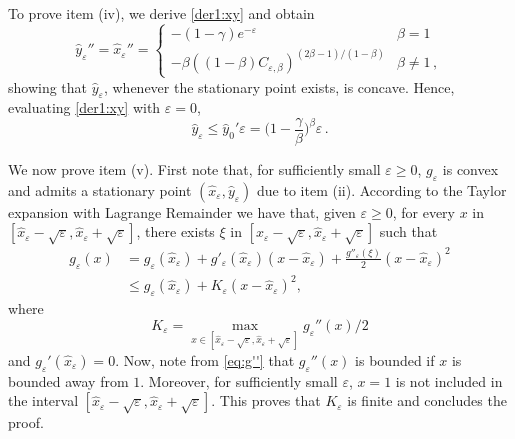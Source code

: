 \documentclass{article}
\begin{document}
        To prove item (iv), we derive \eqref{der1:xy} and obtain 
        $$\hat y_\varepsilon'' = \hat x_\varepsilon'' = 
        \begin{cases}
        -(1-\gamma) e^{-\varepsilon} \quad & \beta = 1 \\
        -\beta ((1-\beta)C_{\varepsilon,\beta})^{(2\beta-1)/(1-\beta)} & \beta \neq 1\,,
        \end{cases}
        $$
showing that $\hat y_\varepsilon$, whenever the stationary point exists, is concave. Hence, evaluating \eqref{der1:xy} with $\varepsilon = 0$,
$$
\hat y_\varepsilon \le \hat y_0' \varepsilon = \Big(1-\frac \gamma \beta\Big)^{\beta} \varepsilon\,.
$$

We now prove item (v). First note that, for sufficiently small $\varepsilon \ge 0$, $g_{\varepsilon}$ is convex and admits a stationary point $(\hat x_{\varepsilon},\hat y_{\varepsilon})$ due to item (ii). According to the Taylor expansion with Lagrange Remainder we have that, given $\varepsilon \ge 0$, for every $x$ in $[\hat{x}_{\varepsilon} - \sqrt{\varepsilon}, \hat{x}_{\varepsilon} + \sqrt{\varepsilon}]$, there exists $\xi$ in $[\hat{x}_{\varepsilon} - \sqrt{\varepsilon}, \hat{x}_{\varepsilon} + \sqrt{\varepsilon}]$ such that
            \begin{align*}
                g_{\varepsilon}(x) &= g_{\varepsilon}(\hat{x}_{\varepsilon}) + g'_{\varepsilon}(\hat{x}_{\varepsilon})(x - \hat{x}_{\varepsilon}) + \frac{g''_{\varepsilon}(\xi)}{2}(x - \hat{x}_{\varepsilon})^2\\
                &\leq g_{\varepsilon}(\hat{x}_{\varepsilon}) + K_\varepsilon(x - \hat{x}_{\varepsilon})^2,
            \end{align*}
            where
            $$
            K_\varepsilon = \max_{x \in [\hat{x}_{\varepsilon} - \sqrt{\varepsilon}, \hat{x}_{\varepsilon} + \sqrt{\varepsilon}]} g_\varepsilon''(x) / 2
            $$
            and $g_\varepsilon'(\hat x_\varepsilon) = 0$.
            Now, note from \eqref{eq:g''} that $g_\varepsilon''(x)$ is bounded if $x$ is bounded away from $1$. Moreover, for sufficiently small $\varepsilon$, $x = 1$ is not included in the interval $[\hat x_{\varepsilon} - \sqrt{\varepsilon}, \hat x_{\varepsilon} + \sqrt{\varepsilon}]$. This proves that $K_{\varepsilon}$ is finite and concludes the proof.
\end{document}

